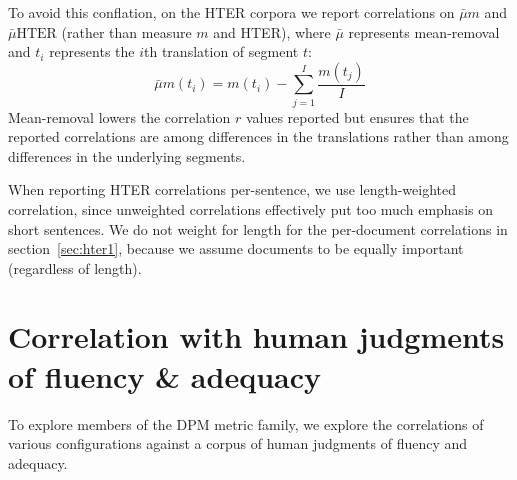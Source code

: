 \documentclass{kluwer}    %
\begin{document}
\begin{article}
To avoid this conflation, on the HTER corpora we report correlations
on $\bar{\mu}m$ and $\bar{\mu}\textrm{HTER}$ (rather than measure
$m$ and HTER), where $\bar{\mu}$ represents mean-removal and $t_i$
represents the $i$th translation of segment $t$:
\begin{equation}
  \label{eq:meansub}
  \bar{\mu}m(t_i) = m(t_i) - \sum_{j=1}^I\frac{m(t_j)}{I}
\end{equation}
Mean-removal lowers the correlation $r$ values reported but ensures
that the reported correlations are among differences in the
translations rather than among differences in the underlying segments.

When reporting HTER correlations per-sentence, we use length-weighted
correlation, since unweighted correlations effectively put too much
emphasis on short sentences.  We do not weight for length for the
per-document correlations in section~\ref{sec:hter1}, because we
assume documents to be equally important (regardless of length).

\section{Correlation with human judgments of fluency \& adequacy}
\label{sec:faexpts}

To explore members of the DPM metric family, we explore the
correlations of various configurations against a corpus of human
judgments of fluency and adequacy.


\end{article}
\end{document}
